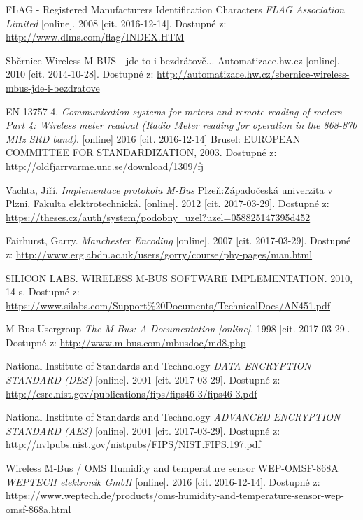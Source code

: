 \begin{literatura}{99}
 FLAG - Registered Manufacturers Identification Characters \textit{FLAG Association Limited} [online]. 2008 [cit. 2016-12-14]. Dostupné z: \url{http://www.dlms.com/flag/INDEX.HTM}

 Sběrnice Wireless M-BUS - jde to i bezdrátově... Automatizace.hw.cz [online]. 2010 [cit. 2014-10-28]. Dostupné z: \url{http://automatizace.hw.cz/sbernice-wireless-mbus-jde-i-bezdratove}

 EN 13757-4. \textit{Communication systems for meters and remote reading of meters - Part 4: Wireless meter readout (Radio Meter reading for operation in the 868-870 MHz SRD band)}. [online] 2016 [cit. 2016-12-14] Brusel: EUROPEAN COMMITTEE FOR STANDARDIZATION, 2003. Dostupné z: \url{http://oldfjarrvarme.unc.se/download/1309/fj}

 Vachta, Jiří. \textit{Implementace protokolu M-Bus} Plzeň:Západočeská univerzita v Plzni, Fakulta elektrotechnická. [online]. 2012 [cit. 2017-03-29]. Dostupné z: \url{https://theses.cz/auth/system/podobny_uzel?uzel=058825147395d452} 

 Fairhurst, Garry. \textit{Manchester Encoding} [online]. 2007 [cit. 2017-03-29]. Dostupné z: \url{http://www.erg.abdn.ac.uk/users/gorry/course/phy-pages/man.html} 

 SILICON LABS. WIRELESS M-BUS SOFTWARE IMPLEMENTATION. 2010, 14 s. Dostupné z: \url{https://www.silabs.com/Support\%20Documents/TechnicalDocs/AN451.pdf}

 M-Bus Usergroup \textit{The M-Bus: A Documentation [online]}. 1998 [cit. 2017-03-29]. Dostupné z: \url{http://www.m-bus.com/mbusdoc/md8.php}

 National Institute of Standards and Technology \textit{DATA ENCRYPTION STANDARD (DES)} [online]. 2001 [cit. 2017-03-29]. Dostupné z: \url{http://csrc.nist.gov/publications/fips/fips46-3/fips46-3.pdf}

 National Institute of Standards and Technology \textit{ADVANCED ENCRYPTION STANDARD (AES)} [online]. 2001 [cit. 2017-03-29]. Dostupné z: \url{http://nvlpubs.nist.gov/nistpubs/FIPS/NIST.FIPS.197.pdf}

 Wireless M-Bus / OMS Humidity and temperature sensor WEP-OMSF-868A \textit{WEPTECH elektronik GmbH} [online]. 2016 [cit. 2016-12-14]. Dostupné z: \url{https://www.weptech.de/products/oms-humidity-and-temperature-sensor-wep-omsf-868a.html}


\end{literatura}
